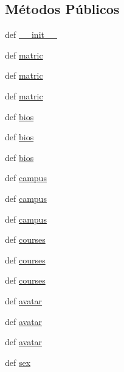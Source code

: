 \subsection*{Métodos Públicos}
\begin{DoxyCompactItemize}
\item 
def \hyperlink{classELO_1_1EntityUnit_1_1Student_a8412271826f20d21632dfe81c7305a4a}{\-\_\-\-\_\-init\-\_\-\-\_\-}
\item 
def \hyperlink{classELO_1_1EntityUnit_1_1Student_a010987e0c79f2b3395a0eb8e415e8f48}{matric}
\item 
def \hyperlink{classELO_1_1EntityUnit_1_1Student_a010987e0c79f2b3395a0eb8e415e8f48}{matric}
\item 
def \hyperlink{classELO_1_1EntityUnit_1_1Student_a010987e0c79f2b3395a0eb8e415e8f48}{matric}
\item 
def \hyperlink{classELO_1_1EntityUnit_1_1Student_a7428c9fbf91bc28ee039df54fbf613a3}{bios}
\item 
def \hyperlink{classELO_1_1EntityUnit_1_1Student_a7428c9fbf91bc28ee039df54fbf613a3}{bios}
\item 
def \hyperlink{classELO_1_1EntityUnit_1_1Student_a7428c9fbf91bc28ee039df54fbf613a3}{bios}
\item 
def \hyperlink{classELO_1_1EntityUnit_1_1Student_ab4085f71869b2d0b5124f3f3ac216b2c}{campus}
\item 
def \hyperlink{classELO_1_1EntityUnit_1_1Student_ab4085f71869b2d0b5124f3f3ac216b2c}{campus}
\item 
def \hyperlink{classELO_1_1EntityUnit_1_1Student_ab4085f71869b2d0b5124f3f3ac216b2c}{campus}
\item 
def \hyperlink{classELO_1_1EntityUnit_1_1Student_a80c6bab040d61102a1ddb1bc0ddaab38}{courses}
\item 
def \hyperlink{classELO_1_1EntityUnit_1_1Student_a80c6bab040d61102a1ddb1bc0ddaab38}{courses}
\item 
def \hyperlink{classELO_1_1EntityUnit_1_1Student_a80c6bab040d61102a1ddb1bc0ddaab38}{courses}
\item 
def \hyperlink{classELO_1_1EntityUnit_1_1Student_adcb290317bcd8aab23370b17c42d26fb}{avatar}
\item 
def \hyperlink{classELO_1_1EntityUnit_1_1Student_adcb290317bcd8aab23370b17c42d26fb}{avatar}
\item 
def \hyperlink{classELO_1_1EntityUnit_1_1Student_adcb290317bcd8aab23370b17c42d26fb}{avatar}
\item 
def \hyperlink{classELO_1_1EntityUnit_1_1Student_a358998b764eed85c81244ee43792f762}{sex}

\end{DoxyCompactItemize}
